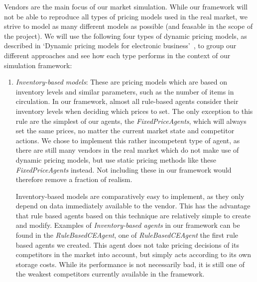 Vendors are the main focus of our market simulation. While our framework will not be able to reproduce all types of pricing models used in the real market, we strive to model as many different models as possible (and feasable in the scope of the project). We will use the following four types of dynamic pricing models, as described in `Dynamic pricing models for electronic business'~\cite{dynamicPricingModels}, to group our different approaches and see how each type performs in the context of our simulation framework:

\begin{enumerate}
	\item \emph{Inventory-based models}: These are pricing models which are based on inventory levels and similar parameters, such as the number of items in circulation. In our framework, almost all rule-based agents consider their inventory levels when deciding which prices to set. The only exception to this rule are the simplest of our agents, the \emph{FixedPriceAgents}, which will always set the same prices, no matter the current market state and competitor actions. We chose to implement this rather incompetent type of agent, as there are still many vendors in the real market which do not make use of dynamic pricing models, but use static pricing methods like these \emph{FixedPriceAgents} instead. Not including these in our framework would therefore remove a fraction of realism.

	      Inventory-based models are comparatively easy to implement, as they only depend on data immediately available to the vendor. This has the advantage that rule based agents based on this technique are relatively simple to create and modify. Examples of \emph{Inventory-based agents} in our framework can be found in the \emph{RuleBasedCEAgent}, one of \emph{RuleBasedCEAgent} the first rule based agents we created. This agent does not take pricing decisions of its competitors in the market into account, but simply acts according to its own storage costs. While its performance is not necessarily bad, it is still one of the weakest competitors currently available in the framework. 


\end{enumerate}
